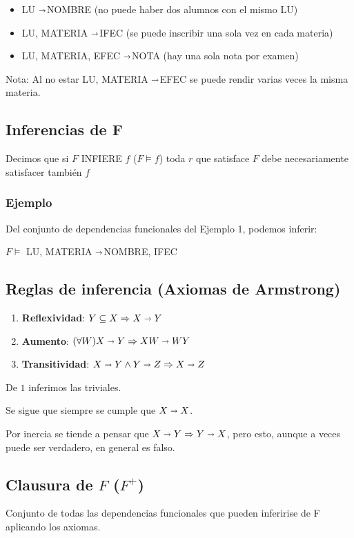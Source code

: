 \documentclass[10pt, a4paper,english,spanish]{article}
\newcommand{\imp}{\shortrightarrow}
\newcommand{\imps}{$\shortrightarrow$}
\begin{document}
\begin{itemize}
    \item LU \imps NOMBRE (no puede haber dos alumnos con el mismo LU)
    \item LU, MATERIA \imps IFEC (se puede inscribir una sola vez en cada materia)
    \item LU, MATERIA, EFEC \imps NOTA (hay una sola nota por examen)
\end{itemize}

Nota: Al no estar LU, MATERIA \imps EFEC se puede rendir varias veces la misma materia.

\subsection{Inferencias de F}


Decimos que si $F$ INFIERE $f$ ($F \vDash f$) toda $r$ que satisface $F$ debe necesariamente satisfacer también $f$

\subsubsection{Ejemplo}
Del conjunto de dependencias funcionales del Ejemplo 1, podemos inferir:

$F \vDash$ LU, MATERIA \imps NOMBRE, IFEC

\subsection{Reglas de inferencia (Axiomas de Armstrong)}
\begin{enumerate}
    \item \textbf{Reflexividad}: $Y \subseteq X \Rightarrow X \imp Y$
    \item \textbf{Aumento}: $(\forall W) X \imp Y \Rightarrow XW \imp WY$
    \item \textbf{Transitividad}: $X \imp Y \land Y \imp Z \Rightarrow X \imp Z$
\end{enumerate}

De $1$ inferimos las triviales.

Se sigue que siempre se cumple que $X \imp X$.

Por inercia se tiende a pensar que $X \imp Y \Rightarrow Y \imp X$, pero esto, aunque a veces puede ser verdadero, en general es falso.


\subsection{Clausura de $F$ ($F^{+}$)}
Conjunto de todas las dependencias funcionales que pueden inferirise de F aplicando los axiomas.
\end{document}
